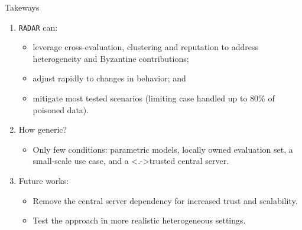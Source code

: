 
\begin{frame}{Takeways}
  \begin{enumerate}
    \onslide<+->
    \item \texttt{RADAR} can:
    \begin{itemize}
      \item leverage \alert{cross-evaluation}, \alert{clustering} and \alert{reputation} to address heterogeneity and Byzantine contributions;
      \item adjust rapidly to changes in behavior; and
      \item mitigate most tested scenarios (limiting case handled up to 80\% of poisoned data).
    \end{itemize}

    \medskip
    \onslide<+->
    \item How generic?
    \begin{itemize}
      \item Only few conditions: parametric models, locally owned evaluation set, a \alert<+->{small-scale use case}, and a \alert<.->{trusted central server}.
    \end{itemize}

    \medskip
    \onslide<+->
    \item Future works:
    \begin{itemize}
      \item Remove the central server dependency for \alert{increased trust and scalability}.
      \item Test the approach in more realistic heterogeneous settings.
    \end{itemize}
  \end{enumerate}
  



\end{frame}